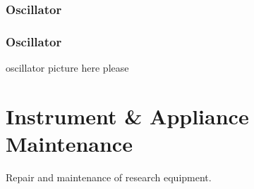 \documentclass{presentation}
\begin{document}
\begin{frame}\frametitle{Oscillator}
\end{frame}

\begin{frame}\frametitle{Oscillator}
  oscillator picture here please
\end{frame}


\section{Instrument \& Appliance Maintenance}

\begin{frame}
  \huge
  Repair and maintenance of research equipment.
\end{frame}
\end{document}

